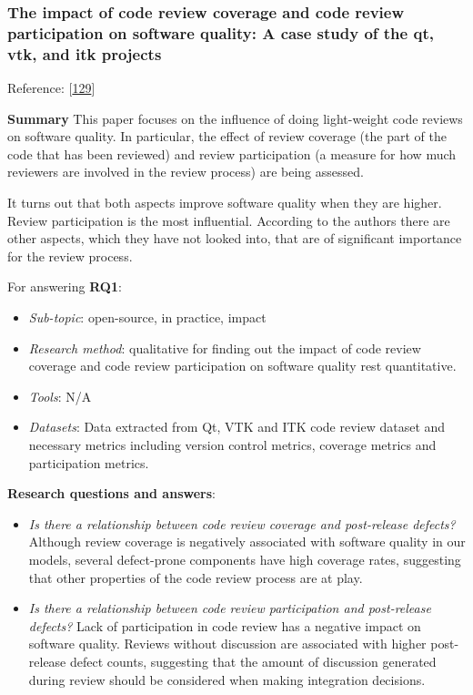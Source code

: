 \documentclass[]{book}
\providecommand{\tightlist}{%
  \setlength{\itemsep}{0pt}\setlength{\parskip}{0pt}}
\begin{document}
\subsubsection{The impact of code review coverage and code review
participation on software quality: A case study of the qt, vtk, and itk
projects}\label{the-impact-of-code-review-coverage-and-code-review-participation-on-software-quality-a-case-study-of-the-qt-vtk-and-itk-projects}

Reference: {[}\protect\hyperlink{ref-mcintosh2014impact}{129}{]}

\textbf{Summary} This paper focuses on the influence of doing
light-weight code reviews on software quality. In particular, the effect
of review coverage (the part of the code that has been reviewed) and
review participation (a measure for how much reviewers are involved in
the review process) are being assessed.

It turns out that both aspects improve software quality when they are
higher. Review participation is the most influential. According to the
authors there are other aspects, which they have not looked into, that
are of significant importance for the review process.

For answering \textbf{RQ1}:

\begin{itemize}
\tightlist
\item
  \emph{Sub-topic}: open-source, in practice, impact
\item
  \emph{Research method}: qualitative for finding out the impact of code
  review coverage and code review participation on software quality rest
  quantitative.
\item
  \emph{Tools}: N/A
\item
  \emph{Datasets}: Data extracted from Qt, VTK and ITK code review
  dataset and necessary metrics including version control metrics,
  coverage metrics and participation metrics.
\end{itemize}

\textbf{Research questions and answers}:

\begin{itemize}
\item
  \emph{Is there a relationship between code review coverage and
  post-release defects?} Although review coverage is negatively
  associated with software quality in our models, several defect-prone
  components have high coverage rates, suggesting that other properties
  of the code review process are at play.
\item
  \emph{Is there a relationship between code review participation and
  post-release defects?} Lack of participation in code review has a
  negative impact on software quality. Reviews without discussion are
  associated with higher post-release defect counts, suggesting that the
  amount of discussion generated during review should be considered when
  making integration decisions.
\end{itemize}
\end{document}
